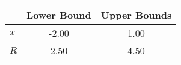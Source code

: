 \begin{tiny}\begin{tabular}{|l|c|c|}
\hline
&\textbf{Lower Bound}&\textbf{Upper Bounds}\\\hline
\textbf{$x$}&-2.00&1.00\\\hline
\textbf{$R$}&2.50&4.50\\\hline
\end{tabular}
\end{tiny}